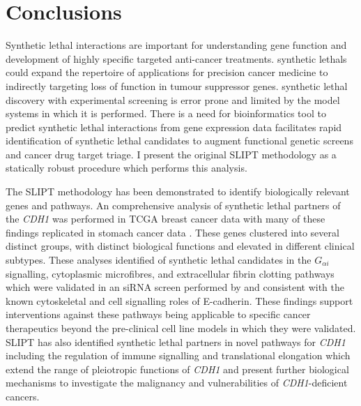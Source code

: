 \clearpage
\section{Conclusions}
\label{chap:conclusion}

Synthetic lethal interactions are important for understanding gene function and development of highly specific targeted anti-cancer \glspl{treatment}. \Glspl{synthetic lethal} could expand the repertoire of applications for precision cancer medicine to indirectly targeting loss of function in \gls{tumour suppressor} genes.  \Gls{synthetic lethal} discovery with experimental screening is error prone and limited by the model systems in which it is performed.  There is a need for \gls{bioinformatics} tool to predict \gls{synthetic lethal} interactions from \gls{gene expression} data facilitates rapid identification of \gls{synthetic lethal} candidates to augment functional genetic screens and cancer drug target triage. I present the original \acrfull{SLIPT} methodology as a statically robust procedure which performs this analysis.

The \gls{SLIPT} methodology has been demonstrated to identify biologically relevant genes and pathways. An comprehensive analysis of \gls{synthetic lethal} partners of the \textit{CDH1} was performed in \gls{TCGA} breast cancer data \citep{TCGA2012} with many of these findings replicated in stomach cancer data \citep{TCGA2014GC}. These genes clustered into several distinct groups, with distinct biological functions and elevated  in different clinical subtypes.  These analyses identified of \gls{synthetic lethal} candidates in the $G_{\alpha i}$ signalling, cytoplasmic microfibres, and extracellular fibrin clotting pathways which were validated in an \gls{siRNA} screen performed by \citet{Telford2015} and consistent with the known cytoskeletal and cell signalling roles of \gls{E-cadherin}. These findings support interventions against these pathways being applicable to specific cancer therapeutics beyond the pre-clinical cell line models in which they were validated. \gls{SLIPT} has also identified \gls{synthetic lethal} partners in novel pathways for \textit{CDH1} including the regulation of immune signalling and translational elongation which extend the range of pleiotropic functions of \textit{CDH1} and present further biological mechanisms to investigate the malignancy and vulnerabilities of \textit{CDH1}-deficient cancers.

